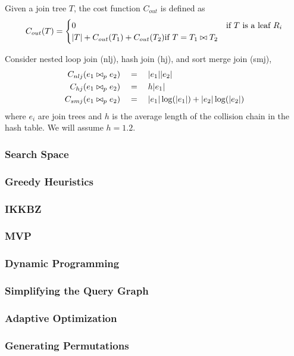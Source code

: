 \documentclass[11pt]{article}
\begin{document}
Given a join tree \(T\), the cost function \(C_{out}\) is defined as
\begin{equation*}
C_{out}(T)=
\begin{cases}
0&\text{if $T$ is a leaf }R_i\\
\abs{T}+C_{out}(T_1)+C_{out}(T_2)\text{if }T=T_1\bowtie T_2
\end{cases}
\end{equation*}

Consider nested loop join (nlj), hash join (hj), and sort merge join (smj), \cite{10.5555/645913.671481}
\begin{align*}
C_{nlj}(e_1\bowtie_pe_2)&\quad=\quad\abs{e_1}\abs{e_2}\\
C_{hj}(e_1\bowtie_pe_2)&\quad=\quad h\abs{e_1}\\
C_{smj}(e_1\bowtie_pe_2)&\quad=\quad\abs{e_1}\log(\abs{e_1})+\abs{e_2}\log(\abs{e_2})
\end{align*}
where \(e_i\) are join trees and \(h\) is the average length of the collision chain in the hash table. We
will assume \(h=1.2\).
\subsubsection{Search Space}
\label{sec:org218a7bf}
\subsubsection{Greedy Heuristics}
\label{sec:org1a4e861}
\subsubsection{IKKBZ}
\label{sec:orgd71b815}
\subsubsection{MVP}
\label{sec:orgd5f030a}
\subsubsection{Dynamic Programming}
\label{sec:orgc117908}
\subsubsection{Simplifying the Query Graph}
\label{sec:orge68e11b}
\subsubsection{Adaptive Optimization}
\label{sec:org5d16f82}
\subsubsection{Generating Permutations}
\label{sec:orge070c5a}
\end{document}
